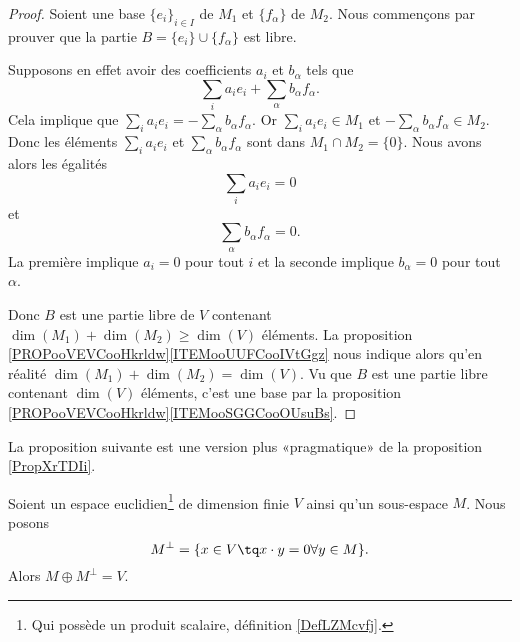 \begin{proof}
    Soient une base \( \{ e_i \}_{i\in I}\) de \( M_1\) et \( \{ f_{\alpha} \}\) de \( M_2\). Nous commençons par prouver que la partie \( B=\{ e_i \}\cup \{ f_{\alpha} \}\) est libre.

    Supposons en effet avoir des coefficients \( a_i\) et \( b_{\alpha}\) tels que
    \begin{equation}
        \sum_ia_ie_i+\sum_{\alpha}b_{\alpha}f_{\alpha}.
    \end{equation}
    Cela implique que \( \sum_ia_ie_i=-\sum_{\alpha}b_{\alpha}f_{\alpha}\). Or \( \sum_ia_ie_i\in M_1\) et \( -\sum_{\alpha}b_{\alpha}f_{\alpha}\in M_2\). Donc les éléments \( \sum_ia_ie_i\) et \( \sum_{\alpha}b_{\alpha}f_{\alpha}\) sont dans \( M_1\cap M_2=\{ 0 \}\). Nous avons alors les égalités
    \begin{equation}
        \sum_ia_ie_i=0
    \end{equation}
    et
    \begin{equation}
        \sum_{\alpha}b_{\alpha}f_{\alpha}=0.
    \end{equation}
    La première implique \( a_i=0\) pour tout \( i\) et la seconde implique \( b_{\alpha}=0\) pour tout \( \alpha\).

    Donc \( B\) est une partie libre de \( V\) contenant \( \dim(M_1)+\dim(M_2)\geq \dim(V)\) éléments. La proposition \ref{PROPooVEVCooHkrldw}\ref{ITEMooUUFCooIVtGgz} nous indique alors qu'en réalité \( \dim(M_1)+\dim(M_2)=\dim(V)\). Vu que \( B\) est une partie libre contenant \( \dim(V)\) éléments, c'est une base par la proposition \ref{PROPooVEVCooHkrldw}\ref{ITEMooSGGCooOUsuBs}.
\end{proof}

La proposition suivante est une version plus «pragmatique» de la proposition \ref{PropXrTDIi}.
\begin{proposition}       \label{PROPooNITTooCYcrrT}
    Soient un espace euclidien\footnote{Qui possède un produit scalaire, définition \ref{DefLZMcvfj}.} de dimension finie \( V\) ainsi qu'un sous-espace \( M\). Nous posons
    \begin{equation}
        M^{\perp}=\{ x\in V\tq x\cdot y=0\forall y\in M \}.
    \end{equation}
    Alors \( M\oplus M^{\perp}=V\).
\end{proposition}

